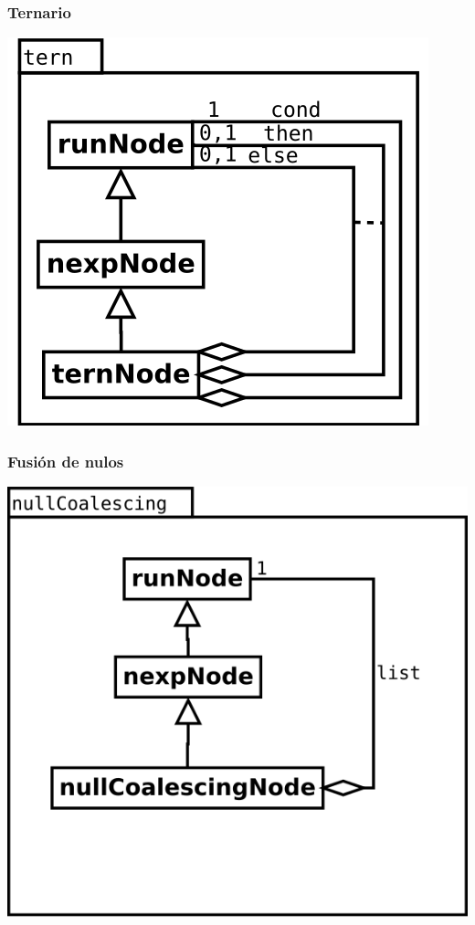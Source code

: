 \subsubsection {Ternario} 
\begin{center}
\includegraphics[scale=0.4]{tern.png} \\
\end{center}

\subsubsection {Fusión de nulos} 
\begin{center}
\includegraphics[scale=0.4]{nullCoalescing.png} \\
\end{center}

